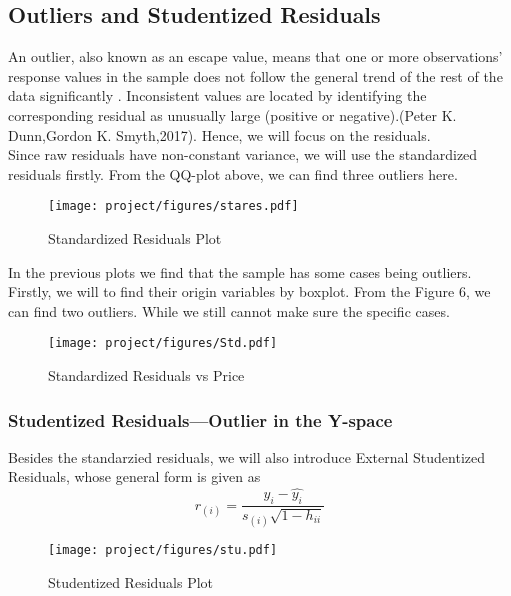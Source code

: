 \documentclass[a4paper]{article}
\begin{document}
\subsection{Outliers and Studentized Residuals}
An outlier, also known as an escape value, means that one or more observations' response values in the sample does not follow the general trend of the rest of the data significantly . Inconsistent values are located by identifying the corresponding residual as unusually large (positive or negative).(Peter K. Dunn,Gordon K. Smyth,2017). Hence, we will focus on the residuals.\\

\noindent
Since raw residuals have non-constant variance, we will use the standardized residuals firstly. From the QQ-plot above, we can find three outliers here. \\
\begin{figure}[!htb]
    \centering
    \texttt{[image: project/figures/stares.pdf]}
    \caption{Standardized Residuals Plot}
    \label{7}
\end{figure}

\noindent
In the previous plots we find that the sample has some cases being outliers. Firstly, we will to find their origin variables by boxplot. From the Figure 6, we can find two outliers. While we still cannot make sure the specific cases.
\begin{figure}[!htb]
    \centering
    \texttt{[image: project/figures/Std.pdf]}
    \caption{Standardized Residuals vs Price}
    \label{8}
\end{figure}





\subsubsection{Studentized Residuals---Outlier in the Y-space}
Besides the standarzied residuals, we will also introduce External Studentized Residuals, whose general form is given as\\
\begin{equation*}
    r_{(i)} =\frac{y_i-\hat{y_{i}}}{s_{(i)}\sqrt{1-h_{ii}}}   
\end{equation*}
\begin{figure}[!htb]
    \centering
    \texttt{[image: project/figures/stu.pdf]}
    \caption{Studentized Residuals Plot}
    \label{9}
\end{figure}
\end{document}
